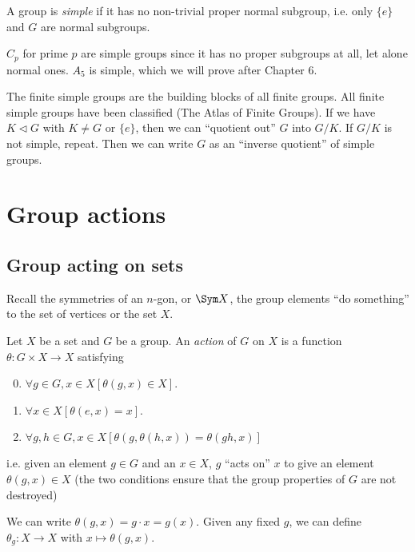 \documentclass[a4paper]{article}
\begin{document}
  \begin{defi}
    A group is \emph{simple} if it has no non-trivial proper normal subgroup, i.e. only $\{e\}$ and $G$ are normal subgroups.
  \end{defi}

  \begin{eg}
    $C_p$ for prime $p$ are simple groups since it has no proper subgroups at all, let alone normal ones.
    $A_5$ is simple, which we will prove after Chapter 6.
  \end{eg}

  The finite simple groups are the building blocks of all finite groups. All finite simple groups have been classified (The Atlas of Finite Groups). If we have $K\lhd G$ with $K\not= G$ or $\{e\}$, then we can ``quotient out'' $G$ into $G/K$. If $G/K$ is not simple, repeat. Then we can write $G$ as an ``inverse quotient'' of simple groups.

  \section{Group actions}
  \subsection{Group acting on sets}
  Recall the symmetries of an $n$-gon, or $\Sym X$, the group elements ``do something'' to the set of vertices or the set $X$.

  \begin{defi}
    Let $X$ be a set and $G$ be a group. An \emph{action} of $G$ on $X$ is a function $\theta: G\times X\to X$ satisfying
    \begin{enumerate}[label=\arabic{*}.]
        \setcounter{enumi}{-1}
      \item $\forall g\in G, x\in X[\theta(g, x)\in X]$.
      \item $\forall x\in X[\theta(e, x) = x]$.
      \item $\forall g, h\in G, x\in X[\theta(g, \theta (h, x)) = \theta(gh, x)]$
    \end{enumerate}
    i.e. given an element $g\in G$ and an $x\in X$, $g$ ``acts on'' $x$ to give an element $\theta(g, x)\in X$ (the two conditions ensure that the group properties of $G$ are not destroyed)
  \end{defi}

  \begin{notation}
    We can write $\theta(g, x) = g\cdot x = g(x)$. Given any fixed $g$, we can define $\theta_g: X\to X$ with $x\mapsto \theta(g, x)$.
  \end{notation}
\end{document}
